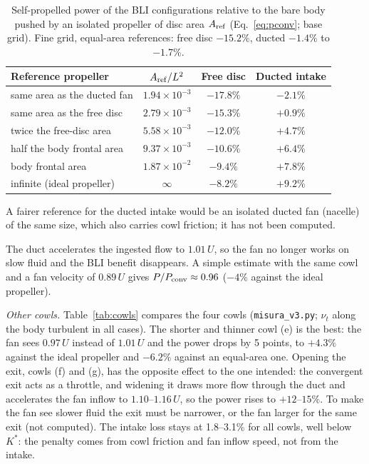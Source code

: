 \documentclass[11pt,a4paper]{article}
\begin{document}
\begin{table}[h]\centering
\caption{Self-propelled power of the BLI configurations relative to the bare body pushed by
an isolated propeller of disc area $A_{\rm ref}$ (Eq.~\ref{eq:pconv}; base grid). Fine grid,
equal-area references: free disc $-15.2\%$, ducted $-1.4\%$ to $-1.7\%$.}\label{tab:ref}
\begin{tabular}{lccc}
\toprule
Reference propeller & $A_{\rm ref}/L^2$ & Free disc & Ducted intake\\
\midrule
same area as the ducted fan & $1.94\times10^{-3}$ & $-17.8\%$ & $-2.1\%$\\
same area as the free disc & $2.79\times10^{-3}$ & $-15.3\%$ & $+0.9\%$\\
twice the free-disc area & $5.58\times10^{-3}$ & $-12.0\%$ & $+4.7\%$\\
half the body frontal area & $9.37\times10^{-3}$ & $-10.6\%$ & $+6.4\%$\\
body frontal area & $1.87\times10^{-2}$ & $-9.4\%$ & $+7.8\%$\\
infinite (ideal propeller) & $\infty$ & $-8.2\%$ & $+9.2\%$\\
\bottomrule
\end{tabular}
\end{table}
A fairer reference for the ducted intake would be an isolated ducted fan (nacelle) of the same
size, which also carries cowl friction; it has not been computed.

The duct accelerates the ingested flow to $1.01\,U$, so the fan no longer works on slow
fluid and the BLI benefit disappears. A simple estimate with the same cowl and a fan
velocity of $0.89\,U$ gives $P/P_{\rm conv}\approx0.96$ ($-4\%$ against the ideal
propeller).

\emph{Other cowls.} Table~\ref{tab:cowls} compares the four cowls
(\texttt{misura\_v3.py}; $\nu_t$ along the body turbulent in all cases). The shorter and
thinner cowl (e) is the best: the fan sees $0.97\,U$ instead of $1.01\,U$ and the power
drops by 5 points, to $+4.3\%$ against the ideal propeller and $-6.2\%$ against an
equal-area one. Opening the exit, cowls (f) and (g), has the opposite effect to the one
intended: the convergent exit acts as a throttle, and widening it draws more flow through
the duct and accelerates the fan inflow to $1.10$--$1.16\,U$, so the power rises to
$+12$--$15\%$. To make the fan see slower fluid the exit must be narrower, or the fan larger
for the same exit (not computed). The intake loss stays at 1.8--3.1\% for all cowls, well below $K^*$: the
penalty comes from cowl friction and fan inflow speed, not from the intake.
\end{document}
